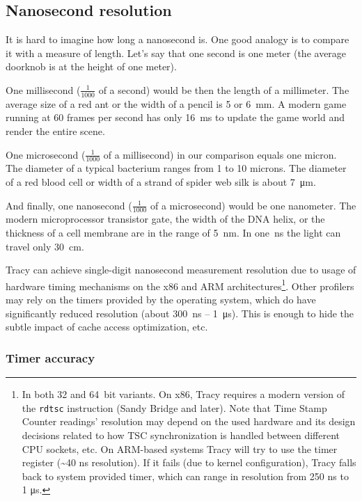 \documentclass[hidelinks,titlepage,a4paper,twoside]{article}
\begin{document}
\subsection{Nanosecond resolution}

It is hard to imagine how long a nanosecond is. One good analogy is to compare it with a measure of length. Let's say that one second is one meter (the average doorknob is at the height of one meter).

One millisecond ($\frac{1}{1000}$ of a second) would be then the length of a millimeter. The average size of a red ant or the width of a pencil is 5 or 6~\si{\milli\metre}. A modern game running at 60 frames per second has only 16~\si{\milli\second} to update the game world and render the entire scene.

One microsecond ($\frac{1}{1000}$ of a millisecond) in our comparison equals one micron. The diameter of a typical bacterium ranges from 1 to 10 microns. The diameter of a red blood cell or width of a strand of spider web silk is about 7~\si{\micro\metre}.

And finally, one nanosecond ($\frac{1}{1000}$ of a microsecond) would be one nanometer. The modern microprocessor transistor gate, the width of the DNA helix, or the thickness of a cell membrane are in the range of 5~\si{\nano\metre}. In one~\si{\nano\second} the light can travel only 30~\si{\centi\meter}.

Tracy can achieve single-digit nanosecond measurement resolution due to usage of hardware timing mechanisms on the x86 and ARM architectures\footnote{In both 32 and 64~bit variants. On x86, Tracy requires a modern version of the \texttt{rdtsc} instruction (Sandy Bridge and later). Note that Time Stamp Counter readings' resolution may depend on the used hardware and its design decisions related to how TSC synchronization is handled between different CPU sockets, etc. On ARM-based systems Tracy will try to use the timer register (\textasciitilde 40 \si{\nano\second} resolution). If it fails (due to kernel configuration), Tracy falls back to system provided timer, which can range in resolution from 250 \si{\nano\second} to 1 \si{\micro\second}.}. Other profilers may rely on the timers provided by the operating system, which do have significantly reduced resolution (about 300~\si{\nano\second} -- 1~\si{\micro\second}). This is enough to hide the subtle impact of cache access optimization, etc.

\subsubsection{Timer accuracy}
\end{document}
